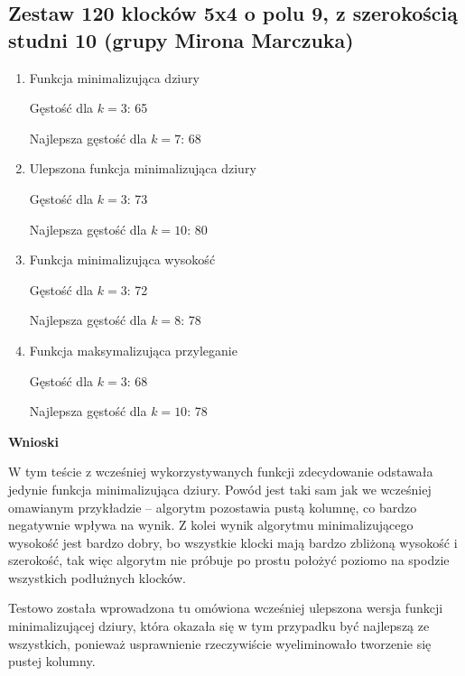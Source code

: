 \documentclass{article}
\begin{document}
\subsection{Zestaw 120 klocków 5x4 o polu 9, z szerokością studni 10 (grupy Mirona Marczuka)}
\begin{enumerate}

\item Funkcja minimalizująca dziury

Gęstość dla $k=3$: 65

Najlepsza gęstość dla $k=7$: 68

\item Ulepszona funkcja minimalizująca dziury

Gęstość dla $k=3$: 73

Najlepsza gęstość dla $k=10$: 80

\item Funkcja minimalizująca wysokość

Gęstość dla $k=3$: 72

Najlepsza gęstość dla $k=8$: 78

\item Funkcja maksymalizująca przyleganie

Gęstość dla $k=3$: 68

Najlepsza gęstość dla $k=10$: 78

\end{enumerate}
\textbf{Wnioski}

W tym teście z wcześniej wykorzystywanych funkcji zdecydowanie odstawała jedynie funkcja minimalizująca dziury. Powód jest taki sam jak we wcześniej omawianym przykładzie -- algorytm pozostawia pustą kolumnę, co bardzo negatywnie wpływa na wynik. Z kolei wynik algorytmu minimalizującego wysokość jest bardzo dobry, bo wszystkie klocki mają bardzo zbliżoną wysokość i szerokość, tak więc algorytm nie próbuje po prostu położyć poziomo na spodzie wszystkich podłużnych klocków.

Testowo została wprowadzona tu omówiona wcześniej ulepszona wersja funkcji minimalizującej dziury, która okazała się w tym przypadku być najlepszą ze wszystkich, ponieważ usprawnienie rzeczywiście wyeliminowało tworzenie się pustej kolumny.
\end{document}
